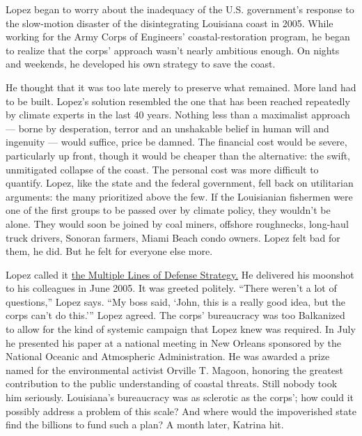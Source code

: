 Lopez began to worry about the inadequacy of the U.S. government's
response to the slow-motion disaster of the disintegrating Louisiana
coast in 2005. While working for the Army Corps of Engineers'
coastal-restoration program, he began to realize that the corps'
approach wasn't nearly ambitious enough. On nights and weekends, he
developed his own strategy to save the coast.

He thought that it was too late merely to preserve what remained. More
land had to be built. Lopez's solution resembled the one that has been
reached repeatedly by climate experts in the last 40 years. Nothing less
than a maximalist approach --- borne by desperation, terror and an
unshakable belief in human will and ingenuity --- would suffice, price
be damned. The financial cost would be severe, particularly up front,
though it would be cheaper than the alternative: the swift, unmitigated
collapse of the coast. The personal cost was more difficult to quantify.
Lopez, like the state and the federal government, fell back on
utilitarian arguments: the many prioritized above the few. If the
Louisianian fishermen were one of the first groups to be passed over by
climate policy, they wouldn't be alone. They would soon be joined by
coal miners, offshore roughnecks, long-haul truck drivers, Sonoran
farmers, Miami Beach condo owners. Lopez felt bad for them, he did. But
he felt for everyone else more.

Lopez called it
\href{https://meridian.allenpress.com/jcr/article-abstract/doi/10.2112/SI54-020.1/192267/The-Multiple-Lines-of-Defense-Strategy-to-Sustain?redirectedFrom=fulltext}{the
Multiple Lines of Defense Strategy.} He delivered his moonshot to his
colleagues in June 2005. It was greeted politely. ``There weren't a lot
of questions,'' Lopez says. ``My boss said, `John, this is a really good
idea, but the corps can't do this.''' Lopez agreed. The corps'
bureaucracy was too Balkanized to allow for the kind of systemic
campaign that Lopez knew was required. In July he presented his paper at
a national meeting in New Orleans sponsored by the National Oceanic and
Atmospheric Administration. He was awarded a prize named for the
environmental activist Orville T. Magoon, honoring the greatest
contribution to the public understanding of coastal threats. Still
nobody took him seriously. Louisiana's bureaucracy was as sclerotic as
the corps'; how could it possibly address a problem of this scale? And
where would the impoverished state find the billions to fund such a
plan? A month later, Katrina hit.

